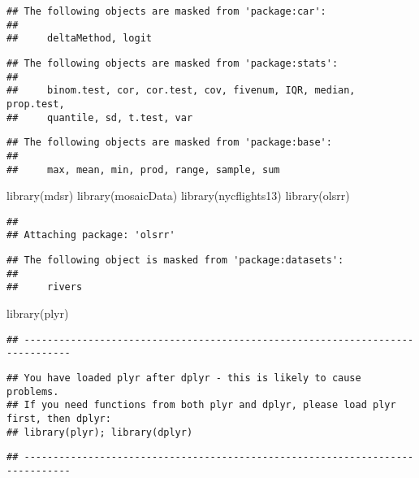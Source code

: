 \documentclass[
]{article}
\newenvironment{Shaded}{\begin{snugshade}}{\end{snugshade}}
\newcommand{\FunctionTok}[1]{\textcolor[rgb]{0.00,0.00,0.00}{#1}}
\newcommand{\NormalTok}[1]{#1}
\begin{document}
\begin{verbatim}
## The following objects are masked from 'package:car':
## 
##     deltaMethod, logit
\end{verbatim}

\begin{verbatim}
## The following objects are masked from 'package:stats':
## 
##     binom.test, cor, cor.test, cov, fivenum, IQR, median, prop.test,
##     quantile, sd, t.test, var
\end{verbatim}

\begin{verbatim}
## The following objects are masked from 'package:base':
## 
##     max, mean, min, prod, range, sample, sum
\end{verbatim}

\begin{Shaded}
\begin{Highlighting}[]
\FunctionTok{library}\NormalTok{(mdsr)}
\FunctionTok{library}\NormalTok{(mosaicData)}
\FunctionTok{library}\NormalTok{(nycflights13)}
\FunctionTok{library}\NormalTok{(olsrr)}
\end{Highlighting}
\end{Shaded}

\begin{verbatim}
## 
## Attaching package: 'olsrr'
\end{verbatim}

\begin{verbatim}
## The following object is masked from 'package:datasets':
## 
##     rivers
\end{verbatim}

\begin{Shaded}
\begin{Highlighting}[]
\FunctionTok{library}\NormalTok{(plyr)}
\end{Highlighting}
\end{Shaded}

\begin{verbatim}
## ------------------------------------------------------------------------------
\end{verbatim}

\begin{verbatim}
## You have loaded plyr after dplyr - this is likely to cause problems.
## If you need functions from both plyr and dplyr, please load plyr first, then dplyr:
## library(plyr); library(dplyr)
\end{verbatim}

\begin{verbatim}
## ------------------------------------------------------------------------------
\end{verbatim}
\end{document}
